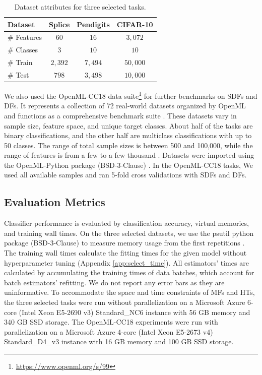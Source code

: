 \begin{table}[htb]
\centering
\begin{tabular}{lccc} 
\hline
Dataset & \textbf{Splice} & \textbf{Pendigits} & \textbf{CIFAR-10} \\
\hline
\# Features & $60$ & $16$ & $3,072$ \\
\hline
\# Classes & $3$ & $10$ & $10$ \\
\hline
\# Train & $2,392$ & $7,494$ & $50,000$ \\
\hline
\# Test & $798$ & $3,498$ & $10,000$ \\
\hline
\end{tabular}
\caption{Dataset attributes for three selected tasks.}
\label{table:data}
\end{table}

We also used the OpenML-CC18 data suite\footnote{\url{https://www.openml.org/s/99}} for further benchmarks on SDFs and DFs. It represents a collection of 72 real-world datasets organized by OpenML and functions as a comprehensive benchmark suite \citep{vanschoren_openml_2013, bischl_openml_2019}. These datasets vary in sample size, feature space, and unique target classes.
About half of the tasks are binary classifications, and the other half are multiclass classifications with up to 50 classes. The range of total sample sizes is between 500 and 100,000, while the range of features is from a few to a few thousand \citep{bischl_openml_2019}.
Datasets were imported using the OpenML-Python package (BSD-3-Clause) \citep{feurer_openml-python_2019}. In the OpenML-CC18 tasks, We used all available samples and ran 5-fold cross validations with SDFs and DFs.

\subsection{Evaluation Metrics}
Classifier performance is evaluated by classification accuracy, virtual memories, and training wall times. 
On the three selected datasets, we use the psutil python package (BSD-3-Clause) to measure memory usage from the first repetitions
\citep{rodola_giampaolopsutil_2022}.
The training wall times calculate the fitting times for the given model without hyperparameter tuning (Appendix \ref{app:select_time}). All estimators' times are calculated by accumulating the training times of data batches, which account for batch estimators' refitting. We do not report any error bars as they are uninformative. 
To accommodate the space and time constraints of MFs and HTs, the three selected tasks were run without parallelization on a Microsoft Azure 6-core (Intel Xeon E5-2690 v3) Standard\_NC6 instance with 56 GB memory and 340 GB SSD storage.
The OpenML-CC18 experiments were run with parallelization on a Microsoft Azure 4-core (Intel Xeon E5-2673 v4) Standard\_D4\_v3 instance with 16 GB memory and 100 GB SSD storage.

